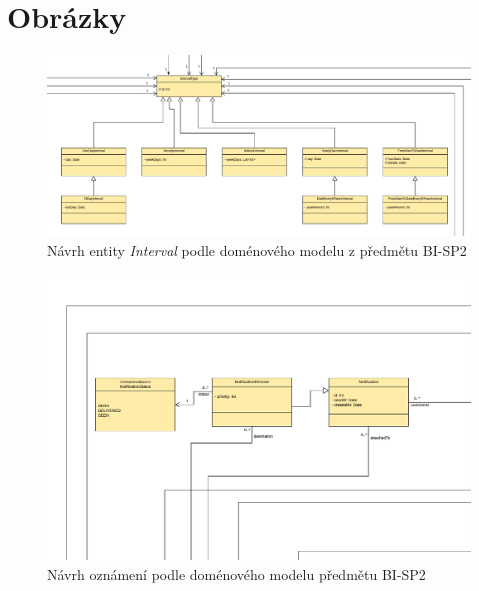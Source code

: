 \chapter{Obrázky}\label{dodatek:images}
    \begin{figure}\centering
        \includegraphics[angle=90, height=0.9\textheight]{pdfs/Interval1}
        \caption[Předešlý návrh entity \texttt{Interval}]{Návrh entity \textit{Interval} podle doménového modelu z předmětu BI-SP2}\label{image:Interval1}
    \end{figure}
    \begin{figure}\centering
            \includegraphics[angle=90, height=0.9\textheight]{pdfs/Notification1}
            \caption[Předešlý návrh oznámení]{Návrh oznámení podle doménového modelu předmětu BI-SP2}\label{image:notification1}
        \end{figure}

